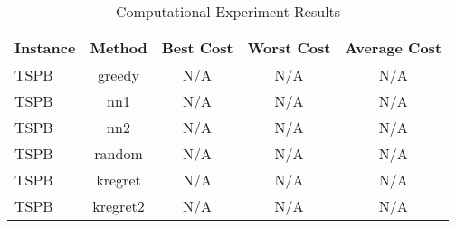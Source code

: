 \begin{table}[ht]
\centering
\caption{Computational Experiment Results}
\label{tab:results}
\begin{tabular}{lcccc}
\hline
Instance & Method & Best Cost & Worst Cost & Average Cost \\
\hline
TSPB & greedy & N/A & N/A & N/A \\
TSPB & nn1 & N/A & N/A & N/A \\
TSPB & nn2 & N/A & N/A & N/A \\
TSPB & random & N/A & N/A & N/A \\
TSPB & kregret & N/A & N/A & N/A \\
TSPB & kregret2 & N/A & N/A & N/A \\
\hline
\end{tabular}
\end{table}
